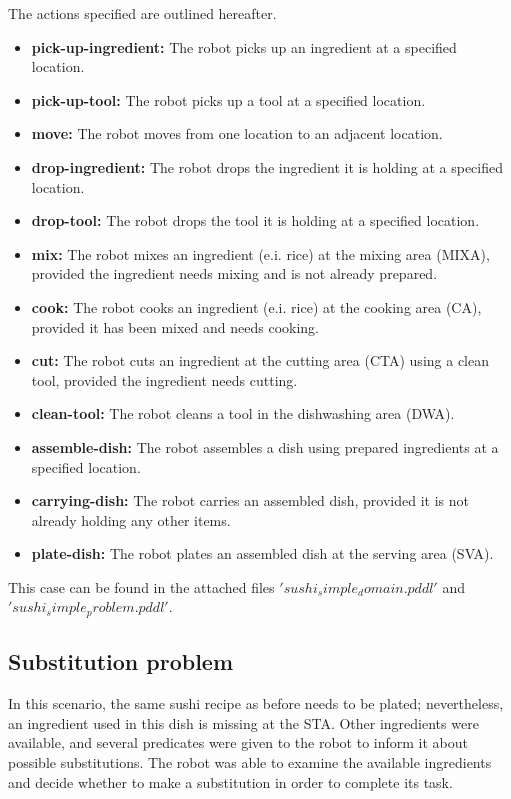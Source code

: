 The actions specified are outlined hereafter.
\begin{itemize}
    \item \textbf{pick-up-ingredient:} The robot picks up an ingredient at a specified location.
    \item \textbf{pick-up-tool:} The robot picks up a tool at a specified location.
    \item \textbf{move:} The robot moves from one location to an adjacent location.
    \item \textbf{drop-ingredient:} The robot drops the ingredient it is holding at a specified location.
    \item \textbf{drop-tool:} The robot drops the tool it is holding at a specified location.
    \item \textbf{mix:} The robot mixes an ingredient (e.i. rice) at the mixing area (MIXA), provided the ingredient needs mixing and is not already prepared.
    \item \textbf{cook:} The robot cooks an ingredient (e.i. rice) at the cooking area (CA), provided it has been mixed and needs cooking.
    \item \textbf{cut:} The robot cuts an ingredient at the cutting area (CTA) using a clean tool, provided the ingredient needs cutting.
    \item \textbf{clean-tool:} The robot cleans a tool in the dishwashing area (DWA).
    \item \textbf{assemble-dish:} The robot assembles a dish using prepared ingredients at a specified location.
    \item \textbf{carrying-dish:} The robot carries an assembled dish, provided it is not already holding any other items.
    \item \textbf{plate-dish:} The robot plates an assembled dish at the serving area (SVA).
\end{itemize}


This case can be found in the attached files $'sushi_simple_domain.pddl'$ and $'sushi_simple_problem.pddl'$.

\subsection{Substitution problem}
In this scenario, the same sushi recipe as before needs to be plated; nevertheless, an ingredient used in this dish is missing at the 
STA. Other ingredients were available, and several predicates were given to the robot to inform it about possible substitutions. 
The robot was able to examine the available ingredients and decide whether to make a substitution in order to complete its task. 

